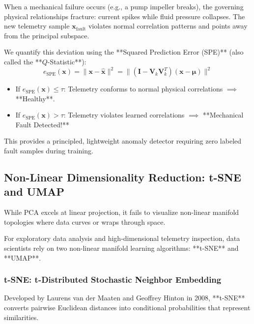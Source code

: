 When a mechanical failure occurs (e.g., a pump impeller breaks), the governing physical relationships fracture: current spikes while fluid pressure collapses. The new telemetry sample $\mathbf{x}_{\text{fault}}$ violates normal correlation patterns and points away from the principal subspace.

We quantify this deviation using the **Squared Prediction Error (SPE)** (also called the **$Q$-Statistic**):
\begin{equation}
e_{\text{SPE}}(\mathbf{x}) = \|\mathbf{x} - \hat{\mathbf{x}}\|^2 = \|(\mathbf{I} - \mathbf{V}_k \mathbf{V}_k^T)(\mathbf{x} - \boldsymbol{\mu})\|^2\label{eq:pca_spe_error}
\end{equation}
\begin{itemize}
    \item If $e_{\text{SPE}}(\mathbf{x}) \le \tau$: Telemetry conforms to normal physical correlations $\implies$ **Healthy**.
    \item If $e_{\text{SPE}}(\mathbf{x}) > \tau$: Telemetry violates learned correlations $\implies$ **Mechanical Fault Detected!**
\end{itemize}
This provides a principled, lightweight anomaly detector requiring zero labeled fault samples during training.

\subsection{Non-Linear Dimensionality Reduction: t-SNE and UMAP}\label{subsec:tsne_umap}

While PCA excels at linear projection, it fails to visualize non-linear manifold topologies where data curves or wraps through space. 

For exploratory data analysis and high-dimensional telemetry inspection, data scientists rely on two non-linear manifold learning algorithms: **t-SNE** and **UMAP**.

\subsubsection{t-SNE: t-Distributed Stochastic Neighbor Embedding}
Developed by Laurens van der Maaten and Geoffrey Hinton in 2008, **t-SNE** converts pairwise Euclidean distances into conditional probabilities that represent similarities.

